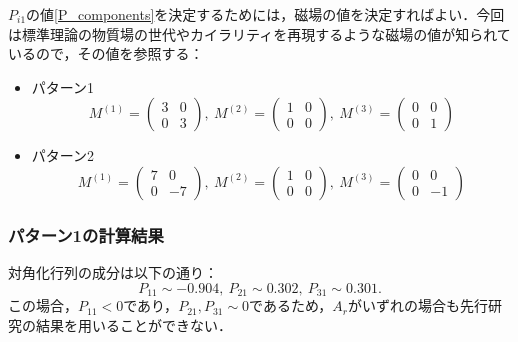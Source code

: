 \documentclass[a4paper,uplatex,dvipdfmx]{jsarticle}
\theoremstyle{definition}
\begin{document}
$P_{i1}$の値\eqref{P_components}を決定するためには，磁場の値を決定すればよい．今回は標準理論の物質場の世代やカイラリティを再現するような磁場の値が知られているので，その値を参照する：
\begin{itemize}
   \item 
   パターン1\cite{Abe_SuperfieldDescription_2012}
   \begin{equation}
      M^{(1)}
      =
      \begin{pmatrix}
        3 & 0 \\
        0 & 3
      \end{pmatrix}
      ,\ 
      M^{(2)}
      =
      \begin{pmatrix}
        1 & 0 \\
        0 & 0
      \end{pmatrix}
      ,\ 
      M^{(3)}
      =
      \begin{pmatrix}
        0 & 0 \\
        0 & 1
      \end{pmatrix}
      \nonumber
   \end{equation}
   \item 
   パターン2\cite{Abe_AhlerModuli_2017}
   \begin{equation}
      M^{(1)}
      =
      \begin{pmatrix}
        7 & 0 \\
        0 & -7
      \end{pmatrix}
      ,\ 
      M^{(2)}
      =
      \begin{pmatrix}
        1 & 0 \\
        0 & 0
      \end{pmatrix}
      ,\ 
      M^{(3)}
      =
      \begin{pmatrix}
        0 & 0 \\
        0 & -1
      \end{pmatrix}
      \nonumber
   \end{equation}
\end{itemize}

\subsubsection*{パターン1の計算結果}

対角化行列の成分は以下の通り：
\begin{equation}
   P_{11}\sim -0.904
   ,\ 
   P_{21}\sim 0.302
   ,\ 
   P_{31}\sim 0.301
   .
   \nonumber
\end{equation}
この場合，$P_{11}<0$であり，$P_{21},P_{31}\sim 0$であるため，$A_{r}$がいずれの場合も先行研究の結果を用いることができない．
\end{document}
